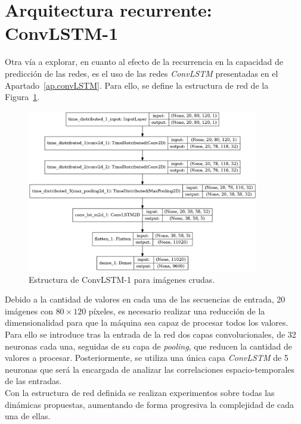 \section{Arquitectura recurrente: ConvLSTM-1}
Otra vía a explorar, en cuanto al efecto de la recurrencia en la capacidad de predicción de las redes, es el uso de las redes \textit{ConvLSTM} presentadas en el Apartado~\ref{ap.convLSTM}. Para ello, se define la estructura de red de la Figura~\ref{fig.convLSTM1}.

\begin{figure}[H]
		\begin{center}
			\includegraphics[width=0.9\textwidth]{ figures/net/REC_convLSTM_simple.png}
			\caption{Estructura de ConvLSTM-1 para imágenes crudas.}
			\label{fig.convLSTM1}
		\end{center}
\end{figure}
\vspace{-10pt}

Debido a la cantidad de valores en cada una de las secuencias de entrada, 20 imágenes con $80 \times 120$ píxeles, es necesario realizar una reducción de la dimensionalidad para que la máquina sea capaz de procesar todos los valores. Para ello se introduce tras la entrada de la red dos capas convolucionales, de 32 neuronas cada una, seguidas de su capa de \textit{pooling}, que reducen la cantidad de valores a procesar. Posteriormente, se utiliza una única capa \textit{ConvLSTM} de 5 neuronas que será la encargada de analizar las correlaciones espacio-temporales de las entradas.\\

Con la estructura de red definida se realizan experimentos sobre todas las dinámicas propuestas, aumentando de forma progresiva la complejidad de cada una de ellas.

